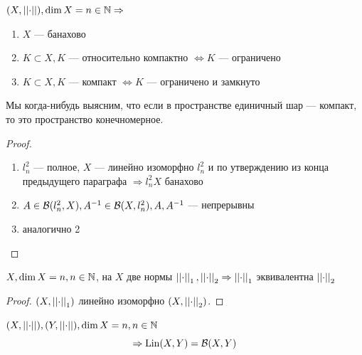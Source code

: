 \documentclass[document]{subfiles}
\begin{document}
\begin{corollary}
    $(X, \left|\left| {\cdot} \right| \right|), \dim X = n \in \mathbb{N} \Rightarrow$
    \begin{enumerate}
        \item $X$ --- банахово 
        \item $K \subset X, K$ --- относительно компактно $\Leftrightarrow K$ --- ограничено
        \item $K \subset X, K$ --- компакт $\Leftrightarrow K$ --- ограничено и замкнуто  
    \end{enumerate}
\end{corollary}
Мы когда-нибудь выясним, что если в пространстве единичный шар --- компакт, то это пространство конечномерное.
\begin{proof}
    \begin{enumerate}
        \item $l^2_n$ --- полное, $X$ --- линейно изоморфно $l^2_n$ и по утверждению из конца предыдущего параграфа $\Rightarrow l^2_n X$ банахово 
        \item $A \in \mathcal{B}(l^2_n, X), A^{-1} \in \mathcal{B}(X, l^2_n), A, A^{-1}$ --- непрерывны 
        \item аналогично 2
    \end{enumerate}
\end{proof}
 
\begin{corollary}
    $X, \dim X = n, n \in \mathbb{N}$, на $X$ две нормы $\left|\left| {\cdot} \right| \right|_1, \left|\left| {\cdot} \right| \right|_2 \Rightarrow \left|\left| {\cdot} \right| \right|_1 $ эквивалентна $\left|\left| {\cdot} \right| \right|_2$
\end{corollary}
\begin{proof}
    $(X, \left|\left| {\cdot} \right| \right|_1)$ линейно изоморфно $(X, \left|\left| {\cdot} \right| \right|_2)$.
\end{proof}
 
\begin{theorem}
    $(X, \left|\left| {\cdot} \right| \right|), (Y, \left|\left| {\cdot} \right| \right|), \dim X = n, n \in \mathbb{N}$
    \[ \Rightarrow \operatorname{Lin}(X,Y) = \mathcal{B}(X,Y) \]
\end{theorem}
\end{document}
